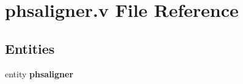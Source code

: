 \section{phsaligner.\-v File Reference}
\label{phsaligner_8v}
\subsection*{Entities}
\begin{DoxyCompactItemize}
\item 
entity {\bf phsaligner}
\end{DoxyCompactItemize}
